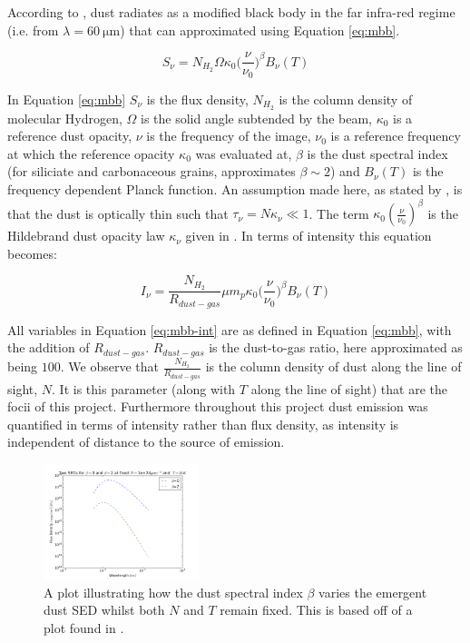 \documentclass{report}
\begin{document}
According to \textcite{dustopacity}, dust radiates as a modified black body in the far infra-red regime (i.e. from $\lambda=\SI{60}{\micro\meter}$) that can approximated using Equation \ref{eq:mbb}.

\begin{equation}
  S_{\nu} = N_{H_{2}} \Omega \kappa_{0} \Big(\frac{\nu}{\nu_{0}}\Big)^{\beta} B_{\nu}(T)
   \label{eq:mbb}
\end{equation}

In Equation \ref{eq:mbb} $S_{\nu}$ is the flux density, $N_{H_{2}}$ is the column density of molecular Hydrogen, $\Omega$ is the solid angle subtended by the beam, $\kappa_{0}$ is a reference dust opacity, $\nu$ is the frequency of the image, $\nu_{0}$ is a reference frequency at which the reference opacity $\kappa_{0}$ was evaluated at, $\beta$ is the dust spectral index (for siliciate and carbonaceous grains, \textcite{beta} approximates $\beta \sim 2$) and $B_{\nu}(T)$ is the frequency dependent Planck function. An assumption made here, as stated by \textcite{kelly}, is that the dust is optically thin such that
$\tau_{\nu} = N\kappa_{\nu} \ll 1$. The term $\kappa_{0}(\frac{\nu}{\nu_{0}})^{\beta}$ is the Hildebrand dust opacity law $\kappa_{\nu}$ given in \textcite{dustopacity}. In terms of intensity this equation becomes:

\begin{equation}
  I_{\nu} = \frac{N_{H_{2}}}{R_{dust-gas}} \mu m_{p} \kappa_{0} \Big(\frac{\nu}{\nu_{0}}\Big)^{\beta} B_{\nu}(T)
   \label{eq:mbb-int}
\end{equation}

All variables in Equation \ref{eq:mbb-int} are as defined in Equation \ref{eq:mbb}, with the addition of $R_{dust-gas}$. $R_{dust-gas}$ is the dust-to-gas ratio, here approximated as being $100$. We observe that $\frac{N_{H_{2}}}{R_{dust-gas}}$ is the column density of dust along the line of sight, $N$. It is this parameter (along with $T$ along the line of sight) that are the focii of this project. Furthermore throughout this project dust emission was quantified in terms of intensity rather than flux density, as intensity is independent of distance to the source of emission.

\begin{figure}
    \includegraphics[width=0.4\textwidth]{../img/flux_density_combined.png}
    \caption[A plot illustrating how the dust spectral index $\beta$ varies the emergent dust SED whilst both $N$ and $T$ remain fixed. This is based off of a plot found in \textcite{noise}.]{A plot illustrating how the dust spectral index $\beta$ varies the emergent dust SED whilst both $N$ and $T$ remain fixed. This is based off of a plot found in \textcite{noise}.}
     \label{fig:beta-ex}
\end{figure}
\end{document}
